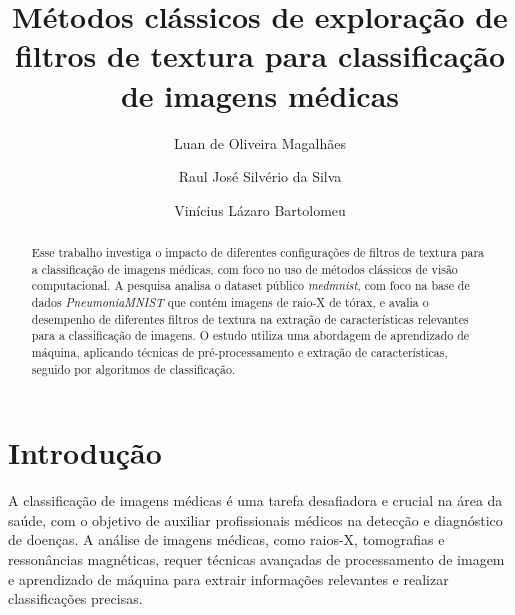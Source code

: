 \documentclass[sigconf,nonacm]{acmart}
\begin{document}
\title{Métodos clássicos de exploração de filtros de textura para classificação de imagens médicas}


\author{Luan de Oliveira Magalhães}

\author{Raul José Silvério da Silva}

\author{Vinícius Lázaro Bartolomeu}

\begin{abstract}
  Esse trabalho investiga o impacto de diferentes configurações de filtros de textura para a classificação de imagens médicas, com foco no uso de métodos clássicos de visão computacional.
  A pesquisa analisa o dataset público \textit{medmnist}, com foco na base de dados \textit{PneumoniaMNIST} que contém imagens de raio-X de tórax, e avalia o desempenho de diferentes filtros de textura na extração de características relevantes para a classificação de imagens.
  O estudo utiliza uma abordagem de aprendizado de máquina, aplicando técnicas de pré-processamento e extração de características, seguido por algoritmos de classificação.
\end{abstract}


\maketitle

\section{Introdução}
A classificação de imagens médicas é uma tarefa desafiadora e crucial na área da saúde, com o objetivo de auxiliar profissionais médicos na detecção e diagnóstico de doenças. A análise de imagens médicas, como raios-X, tomografias e ressonâncias magnéticas, requer técnicas avançadas de processamento de imagem e aprendizado de máquina para extrair informações relevantes e realizar classificações precisas.
\end{document}
